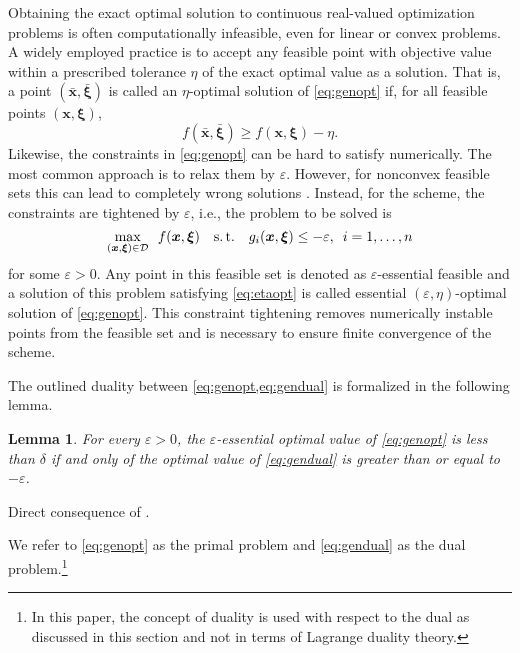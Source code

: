 \documentclass[a4paper,10pt,journal]{IEEEtran}
\newcommand{\st}{\mathrm{s.\,t.}}
\let\vec\bm
\newtheorem{lemma}{Lemma}
\begin{document}
Obtaining the exact optimal solution to continuous real-valued optimization problems is often computationally infeasible, even for linear or convex problems. A widely employed practice is to accept any feasible point with objective value within a prescribed tolerance $\eta$ of the exact optimal value as a solution.
That is, a point $(\bar{\vec x}, \bar{\vec\xi})$
is called an $\eta$-optimal solution of \cref{eq:genopt} if, for all feasible points $(\vec x, \vec\xi)$,
\begin{equation} \label{eq:etaopt}
	f(\bar{\vec x}, \bar{\vec\xi}) \ge f(\vec x, \vec\xi) - \eta.
\end{equation}
Likewise, the constraints in \cref{eq:genopt} can be hard to satisfy numerically. The most common approach is to relax them by $\varepsilon$. However, for nonconvex feasible sets this can lead to completely wrong solutions \cite{Tuy2005a,Tuy2016,sit}. Instead, for the  scheme, the constraints are tightened by $\varepsilon$, i.e., the problem to be solved is
\begin{equation} \label{eq:genoptepsilon}
	\max_{(\vec x, \vec\xi)\in\mathcal D}\enskip f(\vec x, \vec\xi) \quad\st\quad g_i(\vec x, \vec\xi) \le -\varepsilon,\enskip i = 1, \dots, n
\end{equation}
for some $\varepsilon > 0$. Any point in this feasible set is denoted as $\varepsilon$-essential feasible and a solution of this problem satisfying \cref{eq:etaopt} is called essential $(\varepsilon, \eta)$-optimal solution of \cref{eq:genopt}. This constraint tightening removes numerically instable points from the feasible set and is necessary to ensure finite convergence of the  scheme.

The outlined duality between \cref{eq:genopt,eq:gendual} is formalized in the following lemma.
\begin{lemma} \label{lem:duality}
	For every $\varepsilon>0$, the $\varepsilon$-essential optimal value of \cref{eq:genopt} is less than $\delta$ if and only of the optimal value of \cref{eq:gendual} is greater than or equal to $-\varepsilon$.
\end{lemma}
\begin{IEEEproof}
	Direct consequence of \cite[Prop.~1]{Tuy2005a}.
\end{IEEEproof}
We refer to \cref{eq:genopt} as the primal problem and \cref{eq:gendual} as the dual problem.\footnote{In this paper, the concept of duality is used with respect to the  dual as discussed in this section and not in terms of Lagrange duality theory.}
\end{document}
